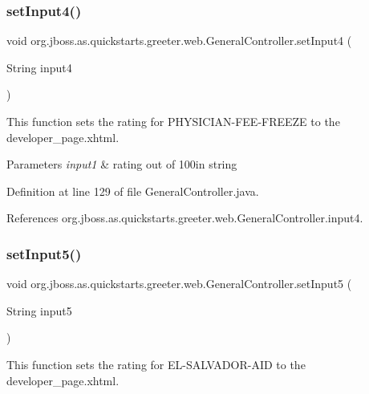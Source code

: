 \subsubsection{\texorpdfstring{set\+Input4()}{setInput4()}}
{\footnotesize\ttfamily void org.\+jboss.\+as.\+quickstarts.\+greeter.\+web.\+General\+Controller.\+set\+Input4 (\begin{DoxyParamCaption}\item[{String}]{input4 }\end{DoxyParamCaption})}



This function sets the rating for P\+H\+Y\+S\+I\+C\+I\+A\+N-\/\+F\+E\+E-\/\+F\+R\+E\+E\+ZE to the developer\+\_\+page.\+xhtml. 


\begin{DoxyParams}{Parameters}
{\em input1} & rating out of 100in string \\
\hline
\end{DoxyParams}


Definition at line 129 of file General\+Controller.\+java.



References org.\+jboss.\+as.\+quickstarts.\+greeter.\+web.\+General\+Controller.\+input4.

\mbox{\label{classorg_1_1jboss_1_1as_1_1quickstarts_1_1greeter_1_1web_1_1_general_controller_ad96ac154b5cfcd08e7c4b59d26c12ef1}} 
\subsubsection{\texorpdfstring{set\+Input5()}{setInput5()}}
{\footnotesize\ttfamily void org.\+jboss.\+as.\+quickstarts.\+greeter.\+web.\+General\+Controller.\+set\+Input5 (\begin{DoxyParamCaption}\item[{String}]{input5 }\end{DoxyParamCaption})}



This function sets the rating for E\+L-\/\+S\+A\+L\+V\+A\+D\+O\+R-\/\+A\+ID to the developer\+\_\+page.\+xhtml. 


